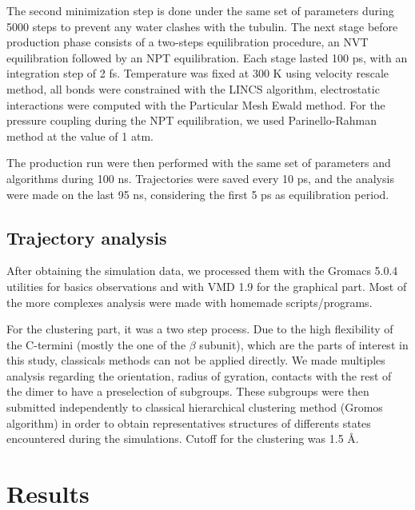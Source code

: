 \documentclass[a4paper]{article}
\begin{document}
The second minimization step is done under the same set of parameters during 5000 steps to prevent any water
clashes with the tubulin. The next stage before production phase consists of a two-steps equilibration procedure,
an NVT equilibration followed by an NPT equilibration. Each stage lasted 100 ps, with an integration step of 2 fs.
Temperature was fixed at 300 K using velocity rescale method, all bonds were constrained with the LINCS algorithm,
electrostatic interactions were computed with the Particular Mesh Ewald method. For the pressure coupling during
the NPT equilibration, we used Parinello-Rahman method at the value of 1 atm.

The production run were then performed with the same set of parameters and algorithms during 100 ns. Trajectories
were saved every 10 ps, and the analysis were made on the last 95 ns, considering the first 5 ps as equilibration
period.


\subsection{Trajectory analysis}

After obtaining the simulation data, we processed them with the Gromacs 5.0.4 utilities for basics observations and
with VMD 1.9 for the graphical part. Most of the more complexes analysis were made with homemade scripts/programs.

For the clustering part, it was a two step process. Due to the high flexibility of the C-termini (mostly the one of
the $\beta$ subunit), which are the parts of interest in this study, classicals methods can not be applied directly.
We made multiples analysis regarding the orientation, radius of gyration, contacts with the rest of the dimer to have
a preselection of subgroups. These subgroups were then submitted independently to classical hierarchical clustering
method (Gromos algorithm) in order to obtain representatives structures of differents states encountered during the
simulations. Cutoff for the clustering was 1.5 {\AA}.



\section{Results}
\end{document}
